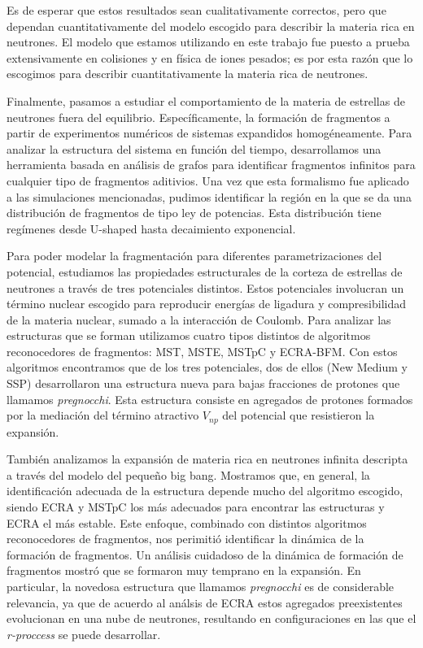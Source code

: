 Es de esperar que estos resultados sean cualitativamente correctos, pero que dependan cuantitativamente del modelo escogido para describir la materia rica en neutrones.
El modelo que estamos utilizando en este trabajo fue puesto a prueba extensivamente en colisiones y en física de iones pesados; es por esta razón que lo escogimos para describir cuantitativamente la materia rica de neutrones.


Finalmente, pasamos a estudiar el comportamiento de la materia de estrellas de neutrones fuera del equilibrio.
Específicamente, la formación de fragmentos a partir de experimentos numéricos de sistemas expandidos homogéneamente.
Para analizar la estructura del sistema en función del tiempo, desarrollamos una herramienta basada en análisis de grafos para identificar fragmentos infinitos para cualquier tipo de fragmentos aditivios.
Una vez que esta formalismo fue aplicado a las simulaciones mencionadas, pudimos identificar la región en la que se da una distribución de fragmentos de tipo ley de potencias.
Esta distribución tiene regímenes desde U-shaped hasta decaimiento exponencial.

Para poder modelar la fragmentación para diferentes parametrizaciones del potencial, estudiamos las propiedades estructurales de la corteza de estrellas de neutrones a través de tres potenciales distintos.
Estos potenciales involucran un término nuclear escogido para reproducir energías de ligadura y compresibilidad de la materia nuclear, sumado a la interacción de Coulomb.
Para analizar las estructuras que se forman utilizamos cuatro tipos distintos de algoritmos reconocedores de fragmentos: MST, MSTE, MSTpC y ECRA-BFM.
Con estos algoritmos encontramos que de los tres potenciales, dos de ellos (New Medium y SSP) desarrollaron una estructura nueva para bajas fracciones de protones que llamamos \emph{pregnocchi}.
Esta estructura consiste en agregados de protones formados por la mediación del término atractivo $V_{np}$ del potencial que resistieron la expansión.

También analizamos la expansión de materia rica en neutrones infinita descripta a través del modelo del pequeño big bang.
Mostramos que, en general, la identificación adecuada de la estructura depende mucho del algoritmo escogido, siendo ECRA y MSTpC los más adecuados para encontrar las estructuras y ECRA el más estable.
Este enfoque, combinado con distintos algoritmos reconocedores de fragmentos, nos perimitió identificar la dinámica de la formación de fragmentos.
Un análisis cuidadoso de la dinámica de formación de fragmentos mostró que se formaron muy temprano en la expansión.
En particular, la novedosa estructura que llamamos \emph{pregnocchi} es de considerable relevancia, ya que de acuerdo al análsis de ECRA estos agregados preexistentes evolucionan en una nube de neutrones, resultando en configuraciones en las que el \emph{r-proccess} se puede desarrollar.

